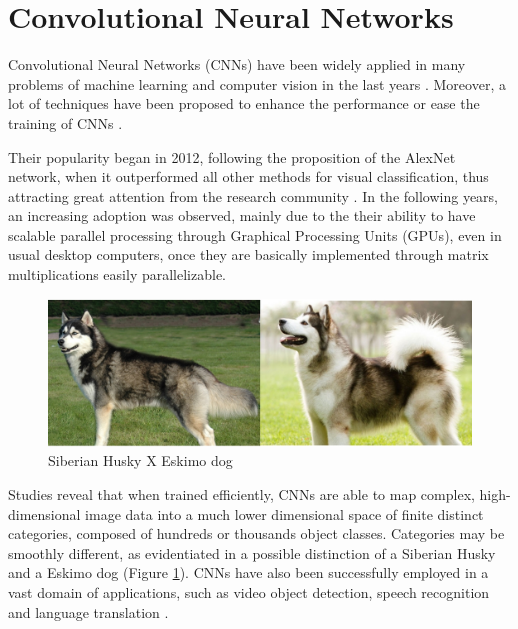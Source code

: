 \section{Convolutional Neural Networks}

Convolutional Neural Networks (CNNs) have been  widely applied in many problems of machine
learning and computer vision in the last years \cite{krizhevsky2012imagenet,szegedy2015going}. Moreover, a lot of techniques have been proposed to enhance the performance or ease
the training of CNNs \cite{simonyan2014very,srivastava2014dropout}.

Their popularity began in 2012, following the proposition of the AlexNet network, when it outperformed all other methods for visual classification, thus attracting great attention from the research community \cite{Krizhevsky:2012:ICD:2999134.2999257}.
In the following years, an increasing adoption was observed, mainly due to the their ability to have scalable parallel processing through Graphical Processing Units (GPUs), even in usual 
desktop computers, once they are basically implemented through matrix multiplications easily parallelizable. 

\begin{figure}[h]
\caption{Siberian Husky X Eskimo dog}
\label{fig:husky}
  \includegraphics[width=\textwidth]{images/husky.jpg}
\end{figure}

Studies reveal that when trained efficiently, CNNs are able
to map complex, high-dimensional image data into a much lower dimensional space of finite
distinct categories, composed of hundreds or thousands object classes. Categories may be smoothly different, as evidentiated in a possible distinction of a Siberian Husky and a Eskimo dog (Figure \ref{fig:husky}). CNNs have also been successfully employed in a vast domain of applications, such as video object detection, speech recognition and language translation \cite{liu2017survey}.

